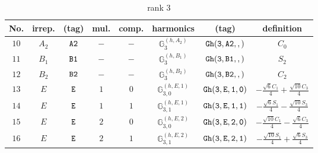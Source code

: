 \documentclass[fleqn,8pt]{jsarticle}
\begin{document}
\begin{table}[ht!]
\begin{center}
\caption{rank 3}
\renewcommand{\arraystretch}{1.3}
\begin{tabular}{cccccccc} \hline \hline
No. & irrep. & (tag) & mul. & comp. & harmonics & (tag) & definition \\ \hline
$ 10 $ & $ A_{2} $ & $ {\tt A2} $ & $ - $ & $ - $ & $ \mathbb{G}_{3}^{(h,A_{2})} $ & $ {\tt Gh(3,A2,,)} $ & $ C_{0} $ \\
$ 11 $ & $ B_{1} $ & $ {\tt B1} $ & $ - $ & $ - $ & $ \mathbb{G}_{3}^{(h,B_{1})} $ & $ {\tt Gh(3,B1,,)} $ & $ S_{2} $ \\
$ 12 $ & $ B_{2} $ & $ {\tt B2} $ & $ - $ & $ - $ & $ \mathbb{G}_{3}^{(h,B_{2})} $ & $ {\tt Gh(3,B2,,)} $ & $ C_{2} $ \\
$ 13 $ & $ E $ & $ {\tt E} $ & $ 1 $ & $ 0 $ & $ \mathbb{G}_{3,0}^{(h,E,1)} $ & $ {\tt Gh(3,E,1,0)} $ & $ - \frac{\sqrt{6} C_{1}}{4} + \frac{\sqrt{10} C_{3}}{4} $ \\
$ 14 $ & $ E $ & $ {\tt E} $ & $ 1 $ & $ 1 $ & $ \mathbb{G}_{3,1}^{(h,E,1)} $ & $ {\tt Gh(3,E,1,1)} $ & $ - \frac{\sqrt{6} S_{1}}{4} - \frac{\sqrt{10} S_{3}}{4} $ \\
$ 15 $ & $ E $ & $ {\tt E} $ & $ 2 $ & $ 0 $ & $ \mathbb{G}_{3,0}^{(h,E,2)} $ & $ {\tt Gh(3,E,2,0)} $ & $ - \frac{\sqrt{10} C_{1}}{4} - \frac{\sqrt{6} C_{3}}{4} $ \\
$ 16 $ & $ E $ & $ {\tt E} $ & $ 2 $ & $ 1 $ & $ \mathbb{G}_{3,1}^{(h,E,2)} $ & $ {\tt Gh(3,E,2,1)} $ & $ - \frac{\sqrt{10} S_{1}}{4} + \frac{\sqrt{6} S_{3}}{4} $ \\
 \hline \hline
\end{tabular}
\end{center}
\end{table}
\end{document}
